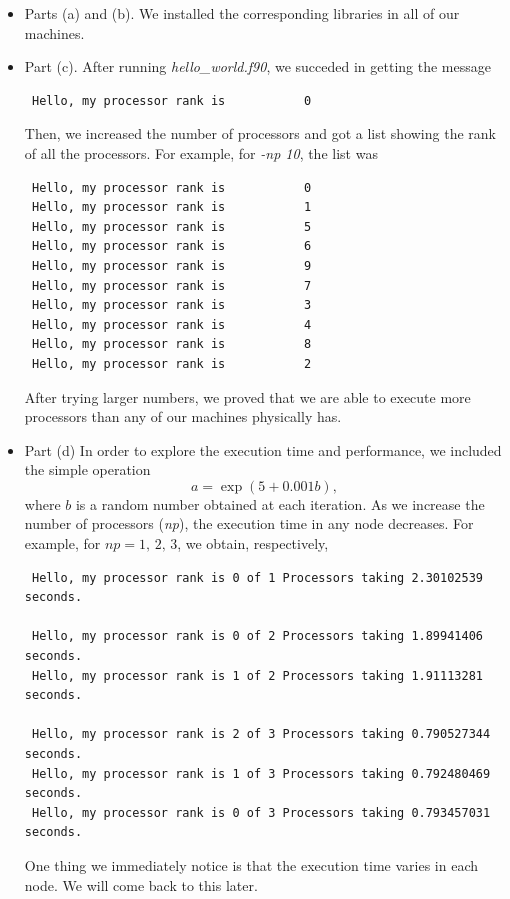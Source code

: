 \documentclass{article}
\begin{document}
\begin{itemize}
 \item Parts (a) and (b). We installed the corresponding libraries in all of our machines.
 
 \item Part (c). After running \textit{hello\_world.f90}, we succeded in getting the message
 \begin{verbatim}
 Hello, my processor rank is           0
 \end{verbatim}
 Then, we increased the number of processors and got a list showing the rank of all the processors. For example,
 for \textit{-np 10}, the list was
 \begin{verbatim}
 Hello, my processor rank is           0
 Hello, my processor rank is           1
 Hello, my processor rank is           5
 Hello, my processor rank is           6
 Hello, my processor rank is           9
 Hello, my processor rank is           7
 Hello, my processor rank is           3
 Hello, my processor rank is           4
 Hello, my processor rank is           8
 Hello, my processor rank is           2
 \end{verbatim}
 After trying larger numbers, we proved that we are able to execute more processors than any of our machines physically has.
 
 \item Part (d) In order to explore the execution time and performance, we included the simple operation
 \begin{equation}
  a = \exp(5+0.001 b),
 \end{equation}
 where $b$ is a random number obtained at each iteration. As we increase the number of processors (\textit{np}), 
 the execution time in any node decreases. For example, for $np = 1, \,2,\,3$, we obtain, respectively,
 \begin{verbatim}
 Hello, my processor rank is 0 of 1 Processors taking 2.30102539 seconds.
 
 Hello, my processor rank is 0 of 2 Processors taking 1.89941406 seconds.
 Hello, my processor rank is 1 of 2 Processors taking 1.91113281 seconds.
 
 Hello, my processor rank is 2 of 3 Processors taking 0.790527344 seconds.
 Hello, my processor rank is 1 of 3 Processors taking 0.792480469 seconds.
 Hello, my processor rank is 0 of 3 Processors taking 0.793457031 seconds.
 \end{verbatim}
One thing we immediately notice is that the execution time varies in each node. We will come back to this later. 


\end{itemize}
\end{document}
